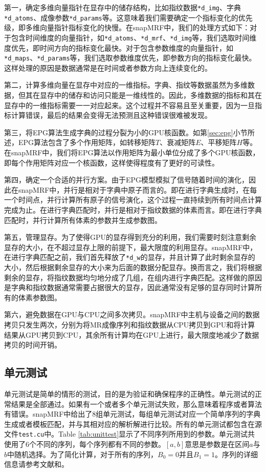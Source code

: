 第一，确定多维向量指针在显存中的储存结构，比如指纹数据\texttt{*d\_img}、字典\texttt{*d\_atoms}、成像参数\texttt{*d\_params}等。这意味着我们需要确定一个指标变化的优先级，即多维向量指针指标变化的快慢。在snapMRF中，我们的处理方式如下：对于包含时间维度的向量指针，如\texttt{*d\_atoms}、\texttt{*d\_mrf}、\texttt{*d\_img}等，我们选取时间维度优先，即时间方向的指标变化最快。对于包含参数维度的向量指针，如\texttt{*d\_maps}、\texttt{*d\_params}等，我们选取参数维度优先，即参数方向的指标变化最快。这样处理的原因是数据通常是在时间或者参数方向上连续变化的。

第二，计算多维向量在显存中对应的一维指标。字典、指纹等数据虽然为多维数据，但其在显存中的储存和访问只能是一维线性的。因此，多维数据的指标和其在显存中的一维指标需要一一对应起来。这个过程并不容易且至关重要，因为一旦指标计算错误，最后的结果会变得无法预测且这种错误很难被发现。

第三，将EPG算法生成字典的过程分裂为小的GPU核函数。如第\ref{sec:epg}小节所述，EPG算法包含了多个作用矩阵，如转移矩阵$T$、衰减矩阵$E$、平移矩阵$H$等。在snapMRF中，我们将EPG算法以作用矩阵为最小单位分成了多个GPU核函数，即每个作用矩阵对应一个核函数，这样使得程度有了更好的可读性。

第四，确定一个合适的并行方案。由于EPG模型模拟了信号随着时间的演化，因此在snapMRF中，并行是相对于字典中原子而言的。即在进行字典生成时，在每一个时间点，并行计算所有原子的信号演化，这个过程一直持续到所有时间点计算完成为止。在进行字典匹配时，并行是相对于指纹数据的体素而言。即在进行字典匹配时，并行计算所有体素的参数并生成参数图。

第五，管理显存。为了使得GPU的显存得到充分的利用，我们需要时刻注意剩余显存的大小，在不超过显存上限的前提下，最大限度的利用显存。snapMRF中，在进行字典匹配之前，我们首先释放了\texttt{*d\_w}的显存，并且计算了此时剩余显存的大小，然后根据剩余显存的大小来为后面的数据分配显存。换而言之，我们将根据剩余的显存，将指纹数据均匀地分成了几组，在组内进行字典匹配。这样做的原因是字典和指纹数据通常需要占据很大的显存，因此通常没有足够的显存同时计算所有的体素参数图。
	
第六，避免数据在GPU与CPU之间多次拷贝。snapMRF中主机与设备之间的数据拷贝只发生两次，分别为将MR成像序列和指纹数据从CPU拷贝到GPU和将计算结果从GPU拷贝到CPU，其余所有计算均在GPU上进行，最大限度地减少了数据拷贝的时间开销。

\subsection{单元测试}
单元测试是简单的情形的测试，目的是为验证和确保程序的正确性。单元测试的正常结果是全部通过。如果有一个或者多个单元测试失败，那么意味着程序或者算法有错误。snapMRF中给出了8组单元测试，每组单元测试对应一个简单序列的字典生成或者模板匹配，并与其相对应的解析解进行比较。所有的单元测试都包含在源文件\texttt{test.cu}中。Table \ref{tab:unittest}显示了不同序列所用到的参数。单元测试共使用了6个不同的序列，每个序列都有不同的参数。$[a,b]$意思是参数是在区间$a$与$b$中随机选择。为了简化计算，对于所有的序列，$B_0=0$并且$B_1=1$。序列的详细信息请参考文献\cite{weigel}和\cite{web}。

